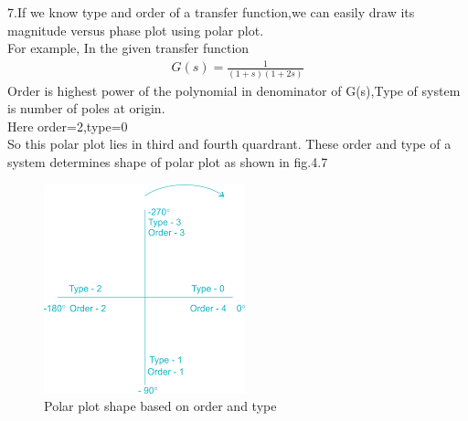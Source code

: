 \begin{enumerate}[label=\thesection.\arabic*.,ref=\thesection.\theenumi]
7.If we know type and order of a transfer function,we can easily draw its magnitude versus phase plot using polar plot.\\
For example,
In the given transfer function\\
\begin{align}
G(s) = \frac{1}{(1+s)(1+2s)}
\end{align}
Order is highest power of the polynomial in denominator of G(s),Type of system is number of poles at origin.\\
Here order=2,type=0\\
So this polar plot lies in third and fourth quardrant.
These order and type of a system determines shape of polar plot as shown in fig.4.7
\begin{figure}
    \centering
    \includegraphics[width=0.7\linewidth]{ee18btech11012_4.png}
    \caption{Polar plot shape based on order and type}
    \label{fig:Graph}
\end{figure}




\end{enumerate}
